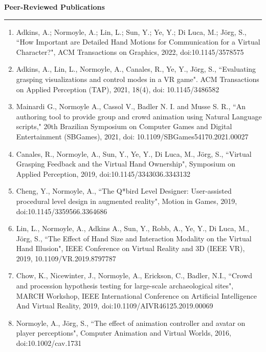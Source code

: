 {\Large {\bf  Peer-Reviewed Publications}}
\vspace{0.1cm}
\hrule
\medskip

\begin{enumerate}[leftmargin=*]

\item Adkins, A.; Normoyle, A.; Lin, L.; Sun, Y.; Ye, Y.; Di Luca, M.; J\"{o}rg, S., ``How Important are Detailed Hand Motions for Communication for a Virtual Character?", ACM Transactions on Graphics, 2022, doi:10.1145/3578575

\item Adkins, A., Lin, L., Normoyle, A., Canales, R., Ye, Y., J\"{o}rg, S., ``Evaluating grasping visualizations and control modes in a VR game". ACM Transactions on Applied Perception (TAP), 2021, 18(4), doi: 10.1145/3486582

\item Mainardi G., Normoyle A., Cassol V., Badler N. I. and Musse S. R., ``An authoring tool to provide group and crowd animation using Natural Language scripts," 20th Brazilian Symposium on Computer Games and Digital Entertainment (SBGames), 2021, doi: 10.1109/SBGames54170.2021.00027

\item Canales, R., Normoyle, A., Sun, Y., Ye, Y., Di Luca, M., J\"{o}rg, S., ``Virtual Grasping Feedback and the Virtual Hand Ownership", Symposium on Applied Perception, 2019, doi:10.1145/3343036.3343132

\item Cheng, Y., Normoyle, A., ``The Q*bird Level Designer: User-assisted procedural level design in augmented reality", Motion in Games, 2019, doi:10.1145/3359566.3364686

\item Lin, L., Normoyle, A., Adkins A., Sun, Y., Robb, A., Ye, Y., Di Luca, M., J\"{o}rg, S., ``The Effect of Hand Size and Interaction Modality on the Virtual Hand Illusion", IEEE Conference on Virtual Reality and 3D (IEEE VR), 2019, 10.1109/VR.2019.8797787

\item Chow, K., Nicewinter, J., Normoyle, A., Erickson, C., Badler, N.I., ``Crowd and procession hypothesis testing for large-scale archaeological sites", MARCH Workshop, IEEE International Conference on Artificial Intelligence And Virtual Reality, 2019, doi:10.1109/AIVR46125.2019.00069

\item Normoyle, A., J\"{o}rg, S., ``The effect of animation controller and avatar on player perceptions", 
Computer Animation and Virtual Worlds, 2016, doi:10.1002/cav.1731


\end{enumerate}
